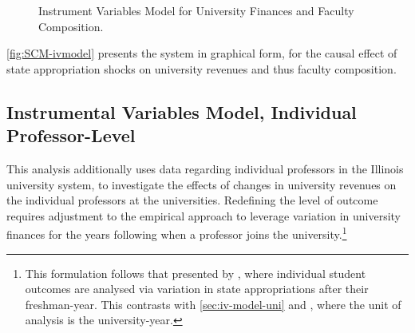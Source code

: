 \documentclass[notitlepage,12pt]{article}
\begin{document}
\begin{figure}[H]
    \centering
    \singlespacing
    \caption{Instrument Variables Model for University Finances and Faculty Composition.}
    \label{fig:SCM-ivmodel}
\end{figure}

\autoref{fig:SCM-ivmodel} presents the system in graphical form, for the causal effect of state appropriation shocks on university revenues and thus faculty composition.


\subsection{Instrumental Variables Model, Individual Professor-Level}
\label{sec:iv-model-indiv}

This analysis additionally uses data regarding individual professors in the Illinois university system, to investigate the effects of changes in university revenues on the individual professors at the universities.
Redefining the level of outcome requires adjustment to the empirical approach to leverage variation in university finances for the years following when a professor joins the university.\footnote{
    This formulation follows that presented by \cite{NBERw27885}, where individual student outcomes are analysed via variation in state appropriations after their freshman-year.
    This contrasts with \autoref{sec:iv-model-uni} and \cite{NBERw23736}, where the unit of analysis is the university-year.
}
\end{document}
